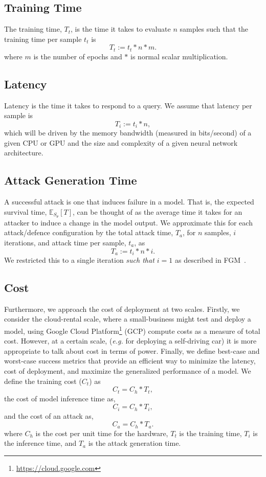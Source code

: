 \documentclass[conference]{IEEEtran}
\newcommand{\cm}[1]{\textit{{\color{blue}#1}}}
\begin{document}
\subsection{Training Time}
The training time, $T_t$, is the time it takes to evaluate $n$ samples such that the training time per sample $t_t$ is
$$
    T_t := t_t * n  * m.
$$
where $m$ is the number of epochs and $*$ is normal scalar multiplication.

\subsection{Latency}
Latency is the time it takes to respond to a query. We assume that latency per sample is
$$
    T_i := t_i *n,
$$
which will be driven by the memory bandwidth (measured in bits/second) of a given CPU or GPU and the size\cite{vgg} and complexity\cite{resnet} of a given neural network architecture.


\subsection{Attack Generation Time}
A successful attack is one that induces failure in a model. That is, the expected survival time, $\mathbb{E}_{S_\theta}[T]$, can be thought of as the average time it takes for an attacker to induce a change in the model output. We approximate this for each attack/defence configuration by the total attack time, $T_a$, for $n$ samples, $i$ iterations, and attack time per sample, $t_a$, as
\begin{equation}
    \label{attack_time}
    T_a := t_i *n *i.
\end{equation}
We restricted this to a single iteration \cm{such that $i =1$} as described in FGM~\cite{fgm}.


\subsection{Cost}
Furthermore, we approach the cost of deployment at two scales. Firstly, we consider the cloud-rental scale, where a small-business might test and deploy a model, using Google Cloud Platform\footnote{\href{https://cloud.google.com}{https://cloud.google.com}} (GCP) compute costs as a measure of total cost. However, at a certain scale, (\textit{e.g.} for deploying a self-driving car) it is  more appropriate to talk about cost in terms of power. Finally, we define best-case and worst-case success metrics that provide an efficient way to minimize the latency, cost of deployment, and 
maximize the generalized performance of a model. We define the training cost ($C_t$) as
$$
    C_t = C_h *T_t,
    \label{eq:cost_training}
$$
the cost of model inference time as,
$$
    C_i = C_h *T_i,
    \label{eq:cost_inference}
$$
and the cost of an attack as,
$$
    C_a = C_h * T_a.
    \label{eq:cost_attack}
$$
where $C_h$ is the cost per unit time for the hardware, $T_t$ is the training time, $T_i$ is the inference time, and $T_a$ is the attack generation time.
\end{document}

